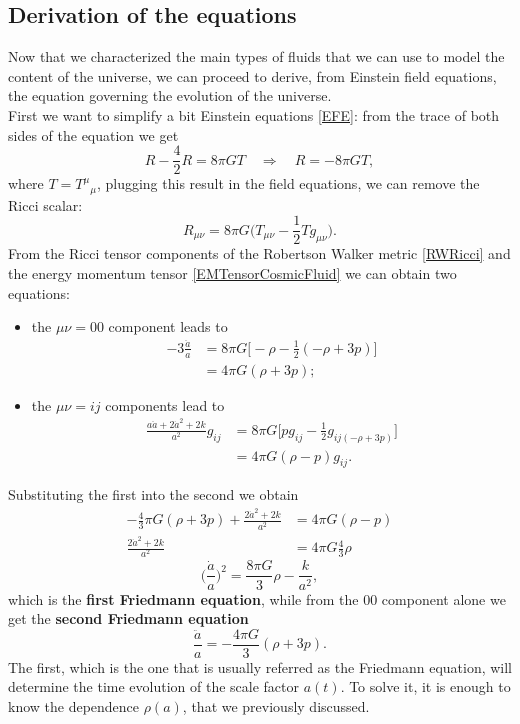 \subsection{Derivation of the equations}
Now that we characterized the main types of fluids that we can use to model the content of the universe, we can proceed to derive, from Einstein field equations, the equation governing the evolution of the universe.\\
First we want to simplify a bit Einstein equations \eqref{EFE}: from the trace of both sides of the equation we get
\begin{equation}
    R-\frac{4}{2}R=8\pi GT\quad\Rightarrow\quad R=-8\pi GT,
\end{equation}
where $T=T^\mu\phantom{}_\mu$, plugging this result in the field equations, we can remove the Ricci scalar:\begin{equation}
    R_{\mu\nu}=8\pi G\bigg(T_{\mu\nu}-\frac{1}{2}Tg_{\mu\nu}\bigg).
\end{equation}
From the Ricci tensor components of the Robertson Walker metric \eqref{RWRicci} and the energy momentum tensor \eqref{EMTensorCosmicFluid} we can obtain two equations:
\begin{itemize}
    \item the $\mu\nu=00$ component leads to
    \begin{align*}
        -3\frac{\ddot a}{a}&=8\pi G\bigg[-\rho-\frac{1}{2}(-\rho+3p)\bigg]\\&=4\pi G(\rho+3p);
    \end{align*}
    \item the $\mu\nu=ij$ components lead to
    \begin{align*}
        \frac{a\ddot a+2\dot a^2+2k}{a^2}g_{ij}&=8\pi G\bigg[pg_{ij}-\frac{1}{2}g_{ij(-\rho+3p)}\bigg]\\&=4\pi G(\rho-p)g_{ij}.
    \end{align*}
\end{itemize}
Substituting the first into the second we obtain
\begin{align}
   -\frac{4}{3}\pi G(\rho+3p) +\frac{2\dot a^2+2k}{a^2}&=4\pi G(\rho-p)\nonumber\\\frac{2\dot a^2+2k}{a^2}&=4\pi G\frac{4}{3}\rho\nonumber
\end{align}
\begin{equation}
    \boxed{\bigg(\frac{\dot a }{a}\bigg)^2=\frac{8\pi G}{3}\rho-\frac{k}{a^2}}\label{Friedmann1},
\end{equation}
which is the \textbf{first Friedmann equation}, while from the $00$ component alone we get the \textbf{second Friedmann equation}
\begin{equation}
    \label{Friedmann2}\boxed{\frac{\ddot a}{a}=-\frac{4\pi G}{3}(\rho+3p)}.
\end{equation}
The first, which is the one that is usually referred as the Friedmann equation, will determine the time evolution of the scale factor $a(t)$. To solve it, it is enough to know the dependence $\rho(a)$, that we previously discussed.
